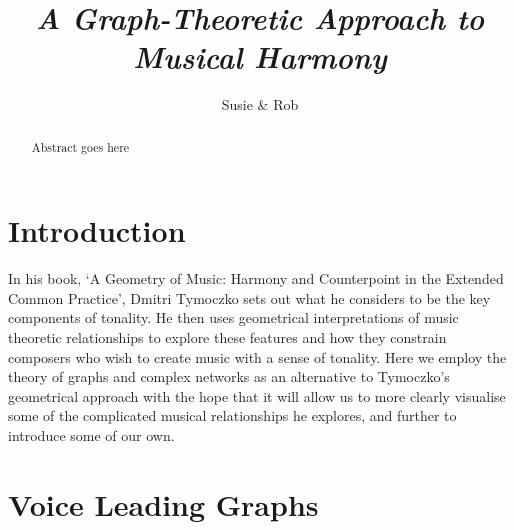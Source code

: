 \documentclass[]{tMAM2e}
\begin{document}
  

    



\title{{\itshape A Graph-Theoretic Approach to Musical Harmony}}

\author{Susie \& Rob }



\maketitle

\begin{abstract}
Abstract goes here
\end{abstract}



\section{Introduction}

In his book, `A Geometry of Music: Harmony and Counterpoint in the Extended Common Practice'\cite{tymoczko2011geometry}, Dmitri Tymoczko sets out what he considers to be the key components of tonality. He then uses geometrical interpretations of music theoretic relationships to explore these features and how they constrain composers who wish to create music with a sense of tonality. Here we employ the theory of graphs and complex networks as an alternative to Tymoczko's geometrical approach with the hope that it will allow us to more clearly visualise some of the complicated musical relationships he explores, and further to introduce some of our own.


\section{Voice Leading Graphs}
\end{document}
